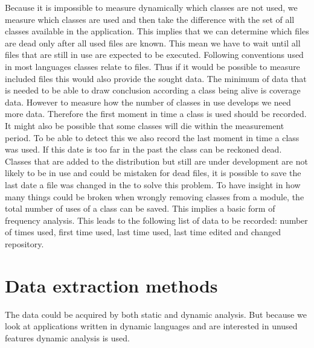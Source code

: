 Because it is impossible to measure dynamically which classes are not used, we measure which classes are used and then take the difference with the set of all classes available in the application. This implies that we can determine which files are dead only after all used files are known. This mean we have to wait until all files that are still in use are expected to be executed. Following conventions used in most languages classes relate to files. Thus if it would be possible to measure included files this would also provide the sought data. The minimum of data that is needed to be able to draw conclusion according a class being alive is coverage\cite{ball1999} data. However to measure how the number of classes in use develops we need more data.  Therefore the first moment in time a class is used should be recorded. It might also be possible that some classes will die within the measurement period. To be able to detect this we also record the last moment in time a class was used. If this date is too far in the past the class can be reckoned dead. Classes that are added to the distribution but still are under development are not likely to be in use and could be mistaken for dead files, it is possible to save the last date a file was changed in the \vcs to solve this problem. To have insight in how many things could be broken when wrongly removing classes from a module, the total number of uses of a class can be saved. This implies a basic form of frequency analysis. This leads to the following list of data to be recorded: number of times used, first time used, last time used, last time edited and changed repository.

\section{Data extraction methods}

The data could be acquired by both static and dynamic analysis. But because we look at applications written in dynamic languages and are interested in unused features dynamic analysis is used. 

